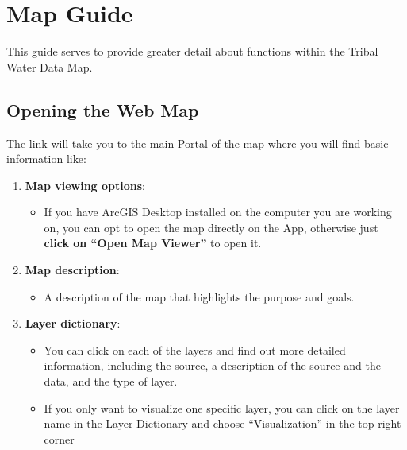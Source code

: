 \documentclass[
  letterpaper,
  DIV=11,
  numbers=noendperiod]{scrreprt}
\providecommand{\tightlist}{%
  \setlength{\itemsep}{0pt}\setlength{\parskip}{0pt}}
\begin{document}

\chapter{Map Guide}\label{map-guide}

This guide serves to provide greater detail about functions within the
Tribal Water Data Map.

\section{\texorpdfstring{\textbf{Opening the Web
Map}}{Opening the Web Map}}\label{opening-the-web-map}

The
\href{https://gispublic.waterboards.ca.gov/portal/home/item.html?id=a71c1841907240e1a4d896c8cf2302a8}{link}
will take you to the main Portal of the map where you will find basic
information like:

\begin{enumerate}
\def\labelenumi{\arabic{enumi}.}
\item
  \textbf{Map viewing options}:

  \begin{itemize}
  \tightlist
  \item
    If you have ArcGIS Desktop installed on the computer you are working
    on, you can opt to open the map directly on the App, otherwise just
    \textbf{click on ``Open Map Viewer''} to open it.
  \end{itemize}
\item
  \textbf{Map description}:

  \begin{itemize}
  \tightlist
  \item
    A description of the map that highlights the purpose and goals.
  \end{itemize}
\item
  \textbf{Layer dictionary}:

  \begin{itemize}
  \tightlist
  \item
    You can click on each of the layers and find out more detailed
    information, including the source, a description of the source and
    the data, and the type of layer.
  \item
    If you only want to visualize one specific layer, you can click on
    the layer name in the Layer Dictionary and choose ``Visualization''
    in the top right corner
  \end{itemize}
\end{enumerate}
\end{document}
